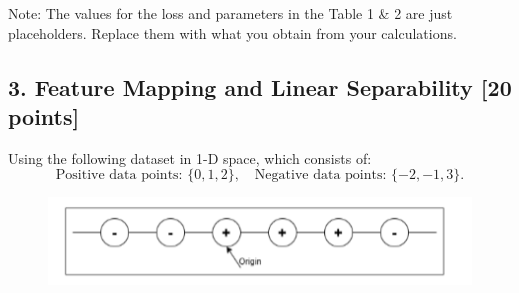 \documentclass[a3paper,12pt]{article} %
\begin{document}
Note: The values for the loss and parameters in the Table 1 \& 2 are just placeholders. Replace them with what you obtain from your calculations.


\vspace{30pt}
\subsection*{3. Feature Mapping and Linear Separability [20 points]}

Using the following dataset in 1-D space, which consists of:
\[
\text{Positive data points: } \{0, 1, 2\}, \quad \text{Negative data points: } \{-2, -1, 3\}.
\]

\begin{figure}[h!]
    \centering
    \includegraphics[width=0.5\linewidth]{drawio.png}
    \label{fig:enter-label}
\end{figure}
\end{document}
